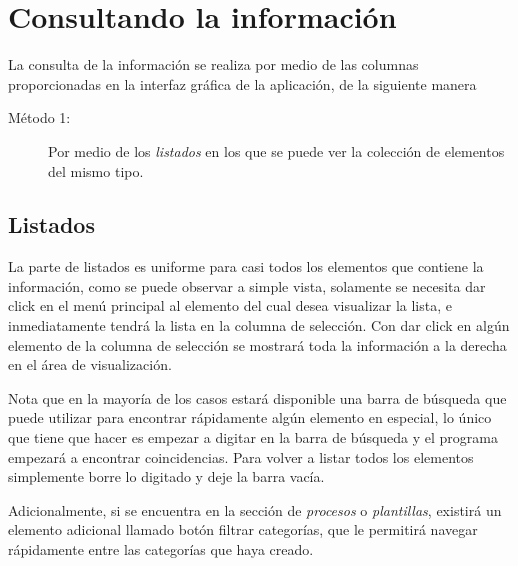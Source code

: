\chapter{Consultando la informaci\'on}
\label{sec:consultandoLaInformacion}
La consulta de la informaci\'on se realiza por medio de las columnas proporcionadas en la interfaz gr\'afica de la aplicaci\'on, de la siguiente manera

\begin{description}
  \item[M\'etodo 1:]Por medio de los \emph{listados} en los que se puede ver la
  colecci\'on de elementos del mismo tipo.
  
\end{description}

\section{Listados}
La parte de listados es uniforme para casi todos los elementos que contiene la informaci\'on, como se puede observar a simple vista, solamente se necesita dar click en el men\'u principal al elemento del cual desea visualizar la lista, e inmediatamente tendr\'a la lista en la columna de selecci\'on. Con dar click en alg\'un elemento de la columna de selecci\'on se mostrar\'a toda la informaci\'on a la derecha en el \'area de visualizaci\'on.

Nota que en la mayor\'ia de los casos estar\'a disponible una barra de b\'usqueda que puede utilizar para encontrar r\'apidamente alg\'un elemento en especial, lo \'unico que tiene que hacer es empezar a digitar en la barra de b\'usqueda y el programa empezar\'a a encontrar coincidencias. Para volver a listar todos los elementos simplemente borre lo digitado y deje la barra vac\'ia.

Adicionalmente, si se encuentra en la secci\'on de \emph{procesos} o \emph{plantillas}, existir\'a un elemento adicional llamado bot\'on filtrar categor\'ias, que le permitir\'a navegar r\'apidamente entre las categor\'ias que haya creado.
